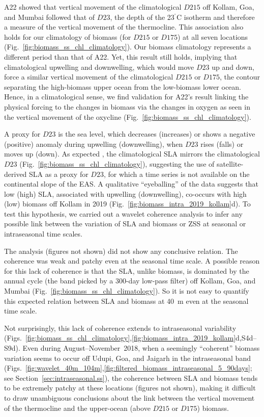 \documentclass[authoryear,review,11pt]{elsarticle}
\newcommand{\cdigri}{{\ensuremath{^{^\circ}}\mathrm{C}}}
\begin{document}
A22 showed that vertical movement of the climatological $D215$ off Kollam, Goa, and Mumbai followed that of $D23$, the depth of the 23$\cdigri$ isotherm and therefore a measure of the vertical movement of the thermocline.  This association also holds for our climatology of biomass (for $D215$ or $D175$) at all seven locations (Fig.~\ref{fig:biomass_ss_chl_climatology}).  Our biomass climatology represents a different period than that of A22. Yet, this result still holds, implying that climatological upwelling and downwelling, which would move $D23$ up and down, force a similar vertical movement of the climatological $D215$ or $D175$, the contour separating the high-biomass upper ocean from the low-biomass lower ocean.  Hence, in a climatological sense, we find validation for A22's result linking the physical forcing to the changes in biomass via the changes in oxygen as seen in the vertical movement of the oxycline (Fig.~\ref{fig:biomass_ss_chl_climatology}).  

A proxy for $D23$ is the sea level, which decreases (increases) or shows a negative (positive) anomaly during upwelling (downwelling), when $D23$ rises (falls) or moves up (down). As expected \citep[see, for example,][]{shankar2000seasonal}, the climatological SLA mirrors the climatological $D23$ (Fig.~\ref{fig:biomass_ss_chl_climatology}), suggesting the use of satellite-derived SLA as a proxy for $D23$, for which a time series is not available on the continental slope of the EAS. A qualitative ``eyeballing'' of the data suggests that low (high) SLA, associated with upwelling (downwelling), co-occurs with high (low) biomass off Kollam in 2019 (Fig.~\ref{fig:biomass_intra_2019_kollam}d).  To test this hypothesis, we carried out a wavelet coherence analysis to infer any possible link between the variation of SLA and biomass or ZSS at seasonal or intraseasonal time scales.  

The analysis (figures not shown) did not show any conclusive relation. The coherence was weak and patchy even at the seasonal time scale. A possible reason for this lack of coherence is that the SLA, unlike biomass, is dominated by the annual cycle (the band picked by a 300-day low-pass filter) off Kollam, Goa, and Mumbai (Fig.~\ref{fig:biomass_ss_chl_climatology}). So it is not easy to quantify this expected relation between SLA and biomass at 40~m even at the seasonal time scale.

Not surprisingly, this lack of coherence extends to intraseasonal variability (Figs.~\ref{fig:biomass_ss_chl_climatology},\ref{fig:biomass_intra_2019_kollam}d,S4d--S9d).  Even during August--November~2018, when a seemingly ``coherent'' biomass variation seems to occur off Udupi, Goa, and Jaigarh in the intraseasonal band (Figs.~\ref{fig:wavelet_40m_104m},\ref{fig:filtered_biomass_intraseasonal_5_90days}; see Section~\ref{sec:intraseasonal.ss}), the coherence between SLA and biomass tends to be extremely patchy at these locations (figures not shown), making it difficult to draw unambiguous conclusions about the link between the vertical movement of the thermocline and the upper-ocean (above $D215$ or $D175$) biomass.
\end{document}
